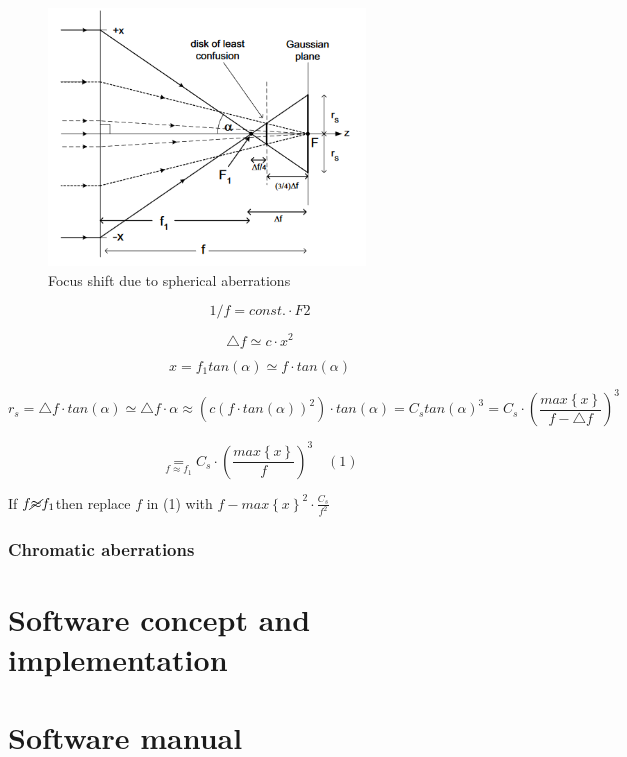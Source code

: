 \documentclass[a4paper,12pt]{article}
\begin{document}
\begin{figure}[h]
  \centering
  \includegraphics[width=0.75\textwidth]{cs_illustration}
  \caption{Focus shift due to spherical aberrations}
\end{figure}

\[
1/f=const.\cdotp F2
\]

\[
\triangle f\simeq c\cdotp x^{2}
\]

\[
x=f_{1}tan\left(\alpha\right)\simeq f\cdotp tan\left(\alpha\right)
\]

\[
r_{s}=\triangle f\cdotp tan\left(\alpha\right)\simeq\triangle f\cdotp\alpha\approx\left(c\left(f\cdotp tan\left(\alpha\right)\right)^{2}\right)\cdotp tan\left(\alpha\right)=C_{s}tan\left(\alpha\right)^{3}=C_{s}\cdotp\left(\frac{max\left\{ x\right\} }{f-\triangle f}\right)^{3}
\]

\[
\underset{f\approx f_{1}}{=}C_{s}\cdotp\left(\frac{max\left\{ x\right\} }{f}\right)^{3}\quad(1)
\]

If $f\cancel{\approx}f_{1}$then replace $f$ in (1) with $f-max\left\{ x\right\} ^{2}\cdotp\frac{C_{s}}{f^{2}}$

\subsubsection{Chromatic aberrations}

\newpage
\section{Software concept and implementation}

\newpage
\section{Software manual}

\newpage
\printbibliography[
heading=bibintoc,
title={References}
]


\end{document}
